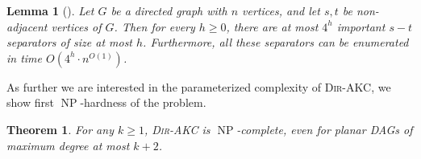 \documentclass[11pt,a4paper]{article}
\newtheorem{theorem}{Theorem}
\newtheorem{lemma}{Lemma}
\DeclareMathOperator{\operatorClassNP}{NP}
\newcommand{\classNP}{\ensuremath{\operatorClassNP}}
\newcommand{\DAKC}{\textsc{Dir-AKC}\xspace}
\begin{document}
\begin{lemma}[\cite{ChitnisHM12}]\label{lem:imp-sep}
Let $G$ be a directed graph with $n$ vertices, and let $s,t$ be non-adjacent vertices of $G$. Then for every $h\geq 0$, there
are at most $4^h$ important $s-t$ separators of size at most $h$. Furthermore, all these separators can be enumerated in time
$O(4^{h}\cdot n^{O(1)})$.
\end{lemma}


As further we are interested in the parameterized complexity of \DAKC, we show first \classNP-hardness of the problem. 


\begin{theorem}\label{thm:NPc}
For any $k\geq 1$, \DAKC is \classNP-complete, even for planar DAGs of maximum degree at
most $k+2$.
\end{theorem}
\end{document}

